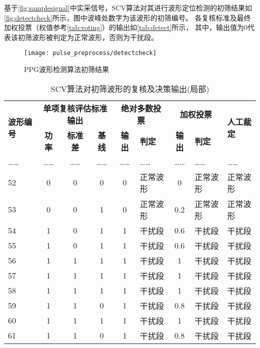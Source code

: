 {基于\autoref{fig:samplesignal}中实采信号，SCV算法对其进行波形定位检测的初筛结果如\autoref{fig:detectcheck}所示，图中波峰处数字为该波形的初筛编号。
各复核标准及最终加权投票（权值参考\autoref{tab:voting}）的输出如\autoref{tab:detect}所示，
其中，输出值为0代表该初筛波形被判定为正常波形，否则为干扰段。
\begin{figure}[htbp]
    \centering
    \texttt{[image: pulse\_preprocess/detectcheck]}
    \caption{\label{fig:detectcheck}PPG波形检测算法初筛结果}
\end{figure}
\begin{table}[htbp]
    \centering
    \caption{\label{tab:detect}SCV算法对初筛波形的复核及决策输出(局部)}
    \begin{tabularx}{\linewidth}{X<{\centering}ccccX<{\centering}cX<{\centering}X<{\centering}}
    \toprule
    \multirow{2}[4]{*}{\textbf{波形编号}} & \multicolumn{3}{c}{\textbf{单项复核评估标准输出}} & \multicolumn{2}{c}{\textbf{绝对多数投票}} & \multicolumn{2}{c}{\textbf{加权投票}} & \multirow{2}[2]{*}{\textbf{人工裁定}}\\
    \cmidrule{2-8} & \textbf{功率} & \textbf{标准差} & \textbf{基线} & \textbf{输出} & \textbf{判定} & \textbf{输出} & \textbf{判定} \\
    \midrule
    ……    & ……    & ……    & ……    & ……    & ……    & ……    & …… & ……\\
    52    & 0     & 0     & 0     & 0     & 正常波形  & 0     & 正常波形 & 正常波形\\
    53    & 0     & 0     & 1     & 0     & 正常波形  & 0.2   & 正常波形 & 正常波形\\
    54    & 1     & 0     & 1     & 1     & 干扰段   & 0.6   & 干扰段 & 干扰段\\
    55    & 1     & 0     & 1     & 1     & 干扰段   & 0.6   & 干扰段 & 干扰段\\
    56    & 1     & 1     & 1     & 1     & 干扰段   & 1     & 干扰段 & 干扰段\\
    57    & 1     & 1     & 1     & 1     & 干扰段   & 1     & 干扰段 & 干扰段\\
    58    & 1     & 1     & 1     & 1     & 干扰段   & 1     & 干扰段 & 干扰段\\
    59    & 1     & 1     & 0     & 1     & 干扰段   & 0.8   & 干扰段 & 干扰段\\
    60    & 1     & 1     & 1     & 1     & 干扰段   & 1     & 干扰段 & 干扰段\\
    61    & 1     & 1     & 0     & 1     & 干扰段   & 0.8   & 干扰段 & 干扰段\\

\end{tabularx}
\end{table}}
